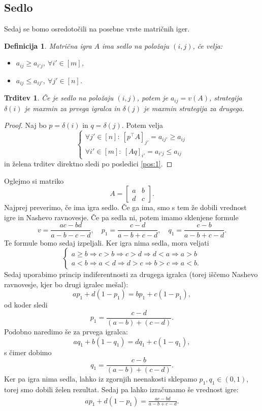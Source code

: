\documentclass[10pt, a4paper]{article}
\newtheorem{trditev}[izr]{Trditev}
\newtheorem{defi}[izr]{Definicija}
\newenvironment{noticeB}{%
  \tcolorbox[%
  notitle,
  empty,
  enhanced,  %
  breakable,
  coltext=black,
  colback=white, 
  fontupper=\rmfamily,
  noparskip,
  sharp corners,
  boxrule=-1pt,  %
  frame hidden,
  left=7pt,  %
  right=7pt,
  top=5pt,
  bottom=5pt,
  before skip=2.5ex plus 2pt,
  after skip=2.5ex plus 2pt,
  borderline west = {1.5pt}{-0.1pt}{blue!30!black}, %
  overlay unbroken and last={%
    \draw[color=black, line width=1.25pt]
    ($(frame.south west)+(1.pt, -0.1pt)$) -- ++(2em, 0);
  }
  ]}
{\endtcolorbox}
\newenvironment{definicija}{\begin{noticeB}\begin{defi}}{%
    \end{defi}\end{noticeB}}
\newenvironment{noticeC}{%
  \tcolorbox[%
  notitle,
  empty,
  enhanced,  %
  breakable,
  coltext=black, 
  fontupper=\rmfamily,
  noparskip,
  sharp corners,
  boxrule=-1pt,  %
  frame hidden,
  left=7pt,  %
  right=7pt,
  top=5pt,
  bottom=5pt,
  before skip=2.5ex plus 2pt,
  after skip=2.5ex plus 2pt,
  overlay unbroken and last={%
  },
  ]}
{\endtcolorbox}
\newenvironment{dokaz}%
  {\begin{noticeC}\begin{proof}}%
  {\end{proof}\end{noticeC}}
\begin{document}
\subsection{Sedlo}

Sedaj se bomo osredotočili na posebne vrste matričnih iger.

\begin{definicija}
  Matrična igra $A$ ima sedlo na položaju $(i, j)$, če velja:
  \begin{itemize}
    \item $a_{ij} \geq a_{i'j},\ \forall i' \in [m]$,
    \item $a_{ij} \leq a_{ij'},\ \forall j' \in [n]$.
  \end{itemize}
\end{definicija}

\begin{trditev}
  Če je sedlo na položaju $(i, j)$, potem je $a_{ij} = v(A)$, strategija $\delta(i)$ je maxmin za prvega igralca 
  in $\delta(j)$ je maxmin strategija za drugega.
\end{trditev}

\begin{dokaz}
  Naj bo $p = \delta(i)$ in $q = \delta(j)$. Potem velja 
  $$\begin{cases}
    \forall j' \in [n]:\ [p^\top A]_{j'} = a_{ij'} \geq a_{ij}\\
    \forall i' \in [m]:\ [Aq]_{i'} = a_{i'j} \leq a_{ij}
  \end{cases}$$
  in želena trditev direktno sledi po posledici \ref{pos:1}.
\end{dokaz}

  Oglejmo si matriko 
  $$A = \begin{bmatrix}
    a & b\\
    d & c
  \end{bmatrix}.$$
  Najprej preverimo, če ima igra sedlo. 
  Če ga ima, smo s tem že dobili vrednost igre in Nashevo ravnovesje.
  Če pa sedla ni, potem imamo sklenjene formule 
  $$v = \frac{ac - bd}{a - b - c - d},\quad p_1 = \frac{c - d}{a - b + c - d},\quad q_1 = \frac{c - b}{a - b + c - d}.$$
  Te formule bomo sedaj izpeljali. Ker igra nima sedla, mora veljati 
  $$\begin{cases}
    a \geq b \Rightarrow c > b \Rightarrow c > d \Rightarrow d < a \Rightarrow a > b\\
    a < b \Rightarrow a < d \Rightarrow d > c \Rightarrow b > c \Rightarrow a < b.
  \end{cases}$$
  Sedaj uporabimo princip indiferentnosti za drugega igralca (torej iščemo Nashevo ravnovesje, kjer bo drugi igralec mešal):
  $$ap_1 + d(1 - p_1) = b p_1 + c (1 - p_1),$$
  od koder sledi 
  $$p_1 = \frac{c - d}{(a - b) + (c - d)}.$$
  Podobno naredimo še za prvega igralca:
  $$aq_1 + b(1 - q_1) = d q_1 + c(1 - q_1),$$
  s čimer dobimo $$q_1 = \frac{c - b}{(a - b) + (c - d)}.$$
  Ker pa igra nima sedla, lahko iz zgornjih neenakosti sklepamo $p_1, q_1 \in (0, 1)$,
  torej smo dobili želen rezultat. Sedaj pa lahko izračunamo še vrednost igre:
  \begin{align*}
    ap_1 + d(1 - p_1) = \frac{ac - bd}{a -b + c - d}.
  \end{align*}
\end{document}
